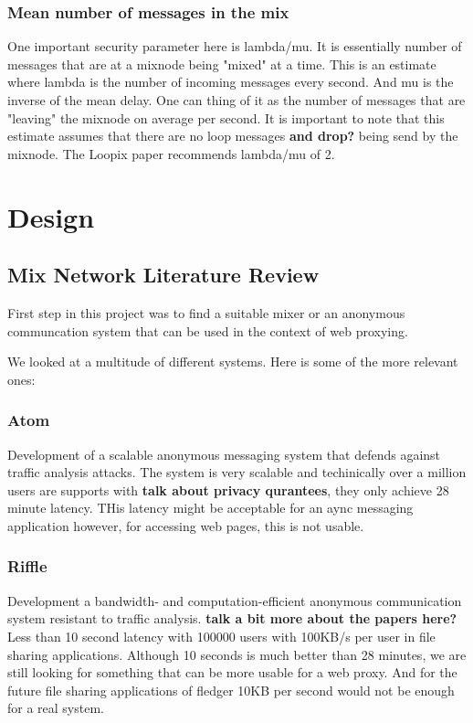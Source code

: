 \documentclass[a4paper,11pt,oneside]{report}
\begin{document}
\subsection{Mean number of messages in the mix}
One important security parameter here is lambda/mu. It is essentially number of messages that are at a mixnode being "mixed" at a time. This is an estimate where lambda is the number of incoming messages every second. And mu is the inverse of the mean delay. One can thing of it as the number of messages that are "leaving" the mixnode on average per second. It is important to note that this estimate assumes that there are no loop messages \textbf{and drop?} being send by the mixnode. The Loopix paper recommends lambda/mu of 2. 


\chapter{Design}


\section{Mix Network Literature Review}
First step in this project was to find a suitable mixer or an anonymous communcation system that can be used in the context of web proxying.

We looked at a multitude of different systems. Here is some of the more relevant ones:

\subsection{Atom}
Development of a scalable anonymous messaging system that defends against traffic analysis attacks. The system is very scalable and techinically over a million users are supports with \textbf{talk about privacy qurantees}, they only achieve 28 minute latency. THis latency might be acceptable for an aync messaging application however, for accessing web pages, this is not usable.

\subsection{Riffle}
Development a bandwidth- and computation-efficient anonymous communication system resistant to traffic analysis. \textbf{talk a bit more about the papers here?} Less than 10 second latency with 100000 users with 100KB/s per user in file sharing applications.  Although 10 seconds is much better than 28 minutes, we are still looking for something that can be more usable for a web proxy. And for the future file sharing applications of fledger 10KB per second would not be enough for a real system.
\end{document}
